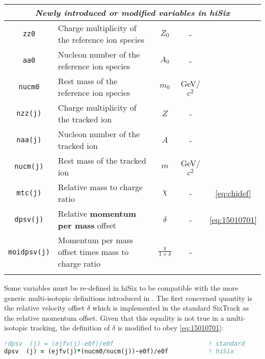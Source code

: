 \begin{table}[h]
\begin{tabular}{clccc}
\multicolumn{5}{c}{\textit{Newly introduced or modified variables in hiSix}}     \\ \midrule
\texttt{zz0}           &  Charge multiplicity of the reference ion species    & $Z_0$     & - &       \\
\texttt{aa0}           &  Nucleon number of the reference ion species         & $A_0$     & - &       \\
\texttt{nucm0}         &  Rest mass of the reference ion species              & $m_0$     & GeV/$c^2$ &       \\
\texttt{nzz(j)}        &  Charge multiplicity of the tracked ion              & $Z$       & - &       \\
\texttt{naa(j)}        &  Nucleon number of the tracked ion                   & $A$       & - &       \\
\texttt{nucm(j)}       &  Rest mass of the tracked ion                        & $m$       & GeV/$c^2$ & \\
\texttt{mtc(j)}        &  Relative mass to charge ratio                       & $\chi$    & - & \eqref{eq:chidef}      \\
\texttt{dpsv(j)}       &  Relative \textbf{momentum per mass} offset          & $\delta$  & -    & \eqref{eq:15010701}     \\
\texttt{moidpsv(j)}    &  Momentum per mass offset times mass to charge ratio & $\frac{\chi}{1+\delta}$    & - &      \\

                   &                       &     \\ \bottomrule
\end{tabular}
\end{table}

Some variables must be re-defined in hiSix to be compatible with the more generic multi-isotopic definitions introduced in \chapref{}. The first concerned quantity is the relative velocity offset $\delta$ which is implemented in the standard SixTrack as the relative momentum offset. Given that this equality is not true in a multi-isotopic tracking, the definition of $\delta$ is modified to obey \eqref{eq:15010701}:
%

\begin{lstlisting}[language=Fortran,caption={Re-definition of $\delta$ for the multi-isotopic case.}, label={lst:delta_redef}]
!dpsv  (j) = (ejfv(j)-e0f)/e0f                          ! standard 
dpsv  (j) = (ejfv(j)*(nucm0/nucm(j))-e0f)/e0f           ! hiSix   
\end{lstlisting}

